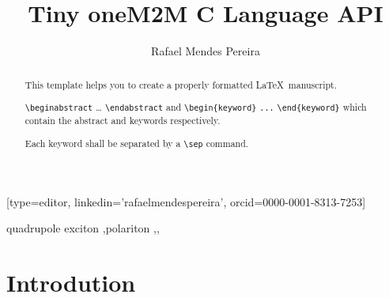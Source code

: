 \documentclass[a4paper,fleqn]{cas-dc}
\begin{document}
\let\WriteBookmarks\relax
\def\floatpagepagefraction{1}
\def\textpagefraction{.001}

\title [mode = title]{Tiny oneM2M C Language API}                      


\author[1]{Rafael Mendes Pereira}[type=editor,
                        linkedin='rafaelmendespereira',
                        orcid=0000-0001-8313-7253]
   
\address[1]{Computer Science and Communications Research Centre, School of Technology and Management, Polytechnic of Leiria, 2411-901 Leiria, Portugal}

\begin{abstract}
This template helps you to create a properly formatted \LaTeX\ manuscript.

\noindent\texttt{\textbackslash begin{abstract}} \dots 
\texttt{\textbackslash end{abstract}} and
\verb+\begin{keyword}+ \verb+...+ \verb+\end{keyword}+ 
which
contain the abstract and keywords respectively. 

\noindent Each keyword shall be separated by a \verb+\sep+ command.
\end{abstract}

%

\begin{keywords}
quadrupole exciton \sep polariton \sep \WGM \sep \BEC
\end{keywords}


\maketitle

\section{Introdution}
\end{document}
